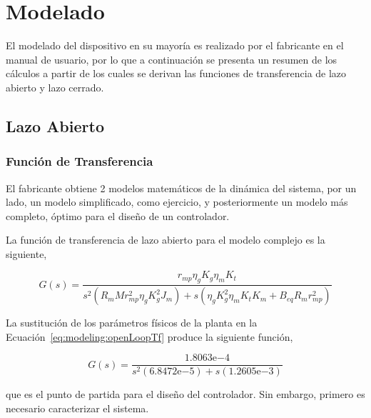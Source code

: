 \documentclass[12pt,a4paper]{article}
\newcommand{\expnum}[2]{{#1}\mathrm{e}{#2}}
\begin{document}
    \pagebreak

	  \section{Modelado}

      El modelado del dispositivo en su mayoría es realizado por el fabricante en el manual de usuario, por lo que 
      a continuación se presenta un resumen de los cálculos a partir de los cuales se derivan las funciones de 
      transferencia de lazo abierto y lazo cerrado. 

      \subsection{Lazo Abierto}  

        \subsubsection{Función de Transferencia}

        El fabricante obtiene 2 modelos matemáticos de la dinámica del sistema, por un lado, un modelo simplificado, 
        como ejercicio, y posteriormente un modelo más completo, óptimo para el diseño de un controlador. 
        
        La función de transferencia de lazo abierto para el modelo complejo es la siguiente, 
        
        \begin{equation}
          G\left(s\right) = \frac{r_{mp} \eta_{g} K_{g} \eta_{m} K_{t}}{s^{2}\left(R_{m} M r_{mp}^{2} \eta_{g} K_{g}^{2} J_{m}\right) + 
          s\left(\eta_{g} K_{g}^{2} \eta_{m} K_{t} K_{m} + B_{eq} R_{m} r_{mp}^{2}\right)}
          \label{eq:modeling:plantTf}
        \end{equation}

        La sustitución de los parámetros físicos de la planta en la Ecuación~\ref{eq:modeling:openLoopTf} produce la
        siguiente función, 
        
        \begin{equation}
          G\left(s\right) = \frac{\expnum{1.8063}{-4}}{s^{2}\left(\expnum{6.8472}{-5}\right) + s\left(\expnum{1.2605}{-3}\right)}
          \label{eq:modeling:openLoopTf}
        \end{equation}

        que es el punto de partida para el diseño del controlador. Sin embargo, primero es necesario caracterizar
        el sistema. 
\end{document}

